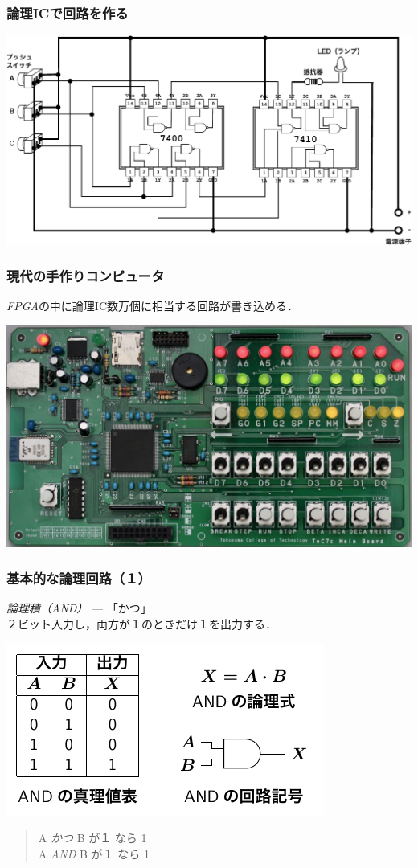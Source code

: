 \documentclass[handout]{beamer}        %
\begin{document}
\begin{frame}
  \frametitle{論理ICで回路を作る}
  \centerline{\includegraphics[scale=0.6]{../Keynote/majority-crop.pdf}}
\end{frame}

\begin{frame}
  \frametitle{現代の手作りコンピュータ}
  \emph{FPGA}の中に論理IC数万個に相当する回路が書き込める．
  \vfill
  \centerline{\includegraphics[scale=0.26]{../Img/TeC7c.jpg}}
\end{frame}

\begin{frame}
  \frametitle{基本的な論理回路（１）}
  \emph{論理積（AND）} --- 「かつ」\\
  \vfill
  ２ビット入力し，両方が１のときだけ１を出力する．
  \centerline{\includegraphics[scale=1.4]{../Tikz/and.pdf}}
  \begin{quote}
    A \emph{かつ} B が１ なら 1\\
    A \emph{AND} B が１ なら 1
  \end{quote}
  \vfill
\end{frame}
\end{document}
